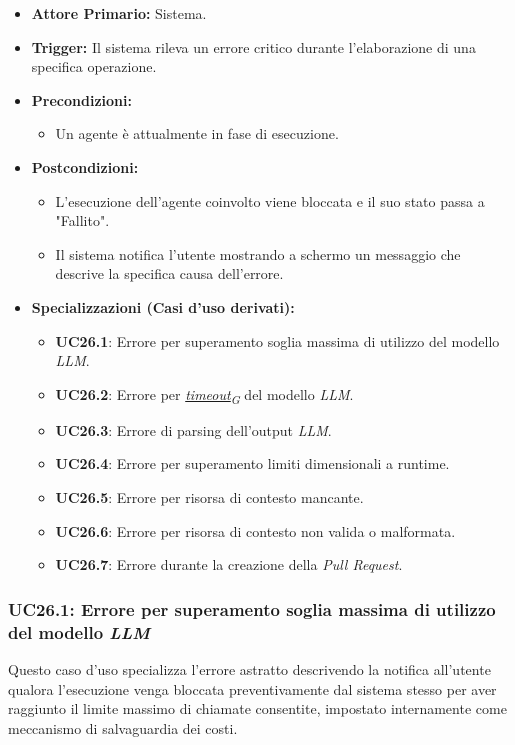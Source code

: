 \documentclass[12pt, a4paper]{article}
\newcommand{\urlglossario}{https://skynetunigroup.github.io/Code_Guardian/Documentazione/PB/glossario_v2.0.0.pdf} %
\newcommand{\glo}[2]{\href{\urlglossario\#nameddest=#2}{#1\textsubscript{G}}}
\begin{document}
\begin{itemize}
    \item \textbf{Attore Primario:} Sistema.
    \item \textbf{Trigger:} Il sistema rileva un errore critico durante l'elaborazione di una specifica operazione.
    \item \textbf{Precondizioni:}
    \begin{itemize}
        \item Un agente è attualmente in fase di esecuzione.
    \end{itemize}
    \item \textbf{Postcondizioni:}
    \begin{itemize}
        \item L'esecuzione dell'agente coinvolto viene bloccata e il suo stato passa a "Fallito".
        \item Il sistema notifica l'utente mostrando a schermo un messaggio che descrive la specifica causa dell'errore.
    \end{itemize}
    \item \textbf{Specializzazioni (Casi d'uso derivati):}
    \begin{itemize}
        \item \textbf{UC26.1}: Errore per superamento soglia massima di utilizzo del modello \textit{LLM}.
        \item \textbf{UC26.2}: Errore per \textit{\glo{timeout}{timeout}} del modello \textit{LLM}.
        \item \textbf{UC26.3}: Errore di parsing dell'output \textit{LLM}.
        \item \textbf{UC26.4}: Errore per superamento limiti dimensionali a runtime.
        \item \textbf{UC26.5}: Errore per risorsa di contesto mancante.
        \item \textbf{UC26.6}: Errore per risorsa di contesto non valida o malformata.
        \item \textbf{UC26.7}: Errore durante la creazione della \textit{Pull Request}.
    \end{itemize}
\end{itemize}

\subsubsection{UC26.1: Errore per superamento soglia massima di utilizzo del modello \textit{LLM}}\label{uc:26.1}
Questo caso d'uso specializza l'errore astratto descrivendo la notifica all'utente qualora l'esecuzione venga bloccata preventivamente dal sistema stesso per aver raggiunto il limite massimo di chiamate consentite, impostato internamente come meccanismo di salvaguardia dei costi.
\end{document}
